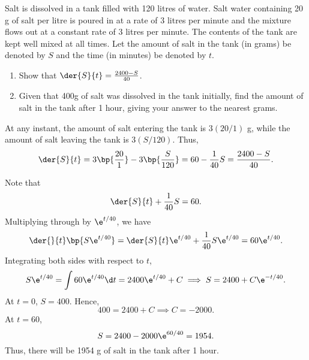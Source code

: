 \begin{problem}
    Salt is dissolved in a tank filled with 120 litres of water. Salt water containing 20 g of salt per litre is poured in at a rate of 3 litres per minute and the mixture flows out at a constant rate of 3 litres per minute. The contents of the tank are kept well mixed at all times. Let the amount of salt in the tank (in grams) be denoted by $S$ and the time (in minutes) be denoted by $t$. 

    \begin{enumerate}
        \item Show that $\der{S}{t} = \frac{2400-S}{40}$.
        \item Given that 400g of salt was dissolved in the tank initially, find the amount of salt in the tank after 1 hour, giving your answer to the nearest grams. 
    \end{enumerate}
\end{problem}
\begin{solution}
    \begin{ppart}
        At any instant, the amount of salt entering the tank is $3(20/1)$ g, while the amount of salt leaving the tank is $3(S/120)$. Thus, \[\der{S}{t} = 3\bp{\frac{20}{1}} - 3\bp{\frac{S}{120}} = 60 - \frac{1}{40} S = \frac{2400 - S}{40}.\]
    \end{ppart}
    \begin{ppart}
        Note that \[\der{S}{t} + \frac1{40} S = 60.\] Multiplying through by $\e^{t/40}$, we have \[\der{}{t} \bp{S\e^{t/40}} = \der{S}{t}\e^{t/40} + \frac1{40} S \e^{t/40} = 60 \e^{t/40}.\] Integrating both sides with respect to $t$, \[S \e^{t/40} = \int 60 \e^{t/40} \d t = 2400 \e^{t/40} + C \implies S = 2400 + C\e^{-t/40}.\] At $t = 0$, $S = 400$. Hence, \[400 = 2400 + C \implies C = -2000.\] At $t = 60$, \[S = 2400 - 2000\e^{60/40} = 1954.\] Thus, there will be 1954 g of salt in the tank after 1 hour.
    \end{ppart}
\end{solution}

